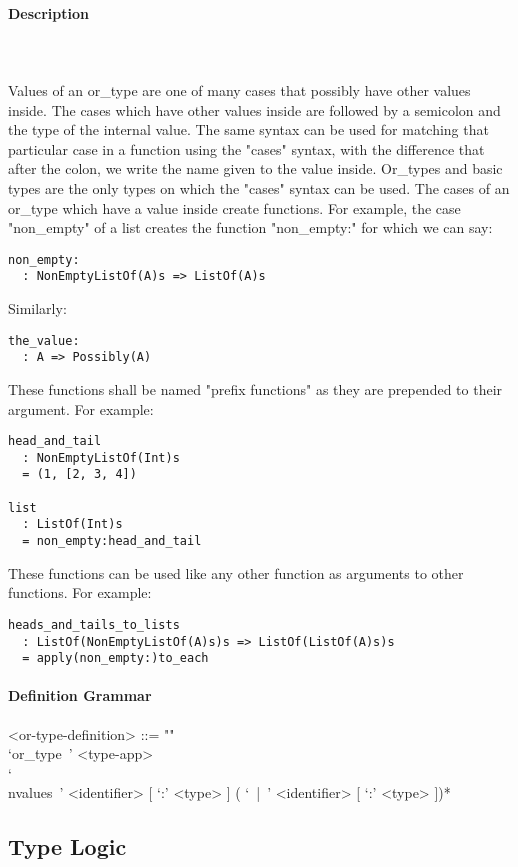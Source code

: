 \documentclass{article}
\def\pend{\mbox{} \\\\}
\begin{document}
\paragraph{Description}\pend
Values of an or\_type are one of many cases that possibly have other values
inside.  The cases which have other values inside are followed by a semicolon
and the type of the internal value. The same syntax can be used for matching
that particular case in a function using the "cases" syntax, with the
difference that after the colon, we write the name given to the value inside.
Or\_types and basic types are the only types on which the "cases" syntax can be
used. The cases of an or\_type which have a value inside create functions. For
example, the case "non\_empty" of a list creates the function "non\_empty:" for
which we can say:
\begin{verbatim}
non_empty:
  : NonEmptyListOf(A)s => ListOf(A)s
\end{verbatim}
Similarly:
\begin{verbatim}
the_value:
  : A => Possibly(A)
\end{verbatim}
These functions shall be named "prefix functions" as they are prepended to their
argument.
For example:
\begin{verbatim}
head_and_tail
  : NonEmptyListOf(Int)s
  = (1, [2, 3, 4])

list
  : ListOf(Int)s
  = non_empty:head_and_tail
\end{verbatim}
These functions can be used like any other function as arguments to other functions.
For example:
\begin{verbatim}
heads_and_tails_to_lists
  : ListOf(NonEmptyListOf(A)s)s => ListOf(ListOf(A)s)s
  = apply(non_empty:)to_each
\end{verbatim}

\paragraph{Definition Grammar}
\begin{grammar}
<or-type-definition> ::= ""\\
`or_type\ ' <type-app> 
\\`\\nvalues\ ' <identifier> [ `:' <type> ] ( `\ |\ ' <identifier> [ `:' <type> ])*
\end{grammar}

\subsection{Type Logic}
\label{subsec:typelogic}
\end{document}
